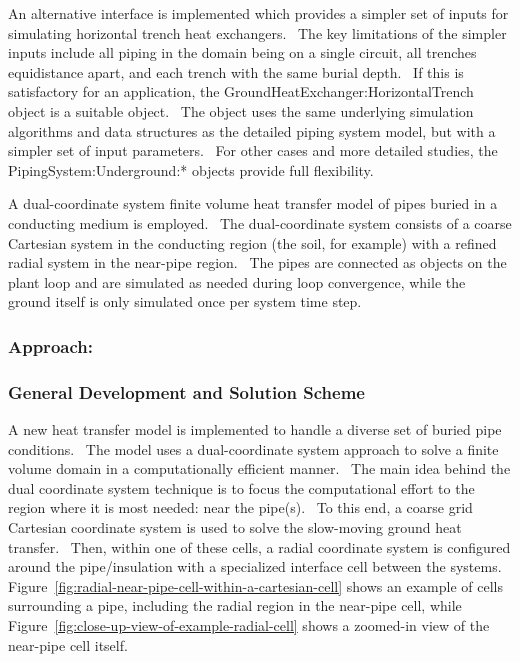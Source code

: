 An alternative interface is implemented which provides a simpler set of inputs for simulating horizontal trench heat exchangers.~ The key limitations of the simpler inputs include all piping in the domain being on a single circuit, all trenches equidistance apart, and each trench with the same burial depth.~ If this is satisfactory for an application, the GroundHeatExchanger:HorizontalTrench object is a suitable object.~ The object uses the same underlying simulation algorithms and data structures as the detailed piping system model, but with a simpler set of input parameters.~ For other cases and more detailed studies, the PipingSystem:Underground:* objects provide full flexibility.

A dual-coordinate system finite volume heat transfer model of pipes buried in a conducting medium is employed.~ The dual-coordinate system consists of a coarse Cartesian system in the conducting region (the soil, for example) with a refined radial system in the near-pipe region.~ The pipes are connected as objects on the plant loop and are simulated as needed during loop convergence, while the ground itself is only simulated once per system time step.

\subsubsection{Approach:}\label{approach-002}

\subsubsection{General Development and Solution Scheme}\label{general-development-and-solution-scheme}

A new heat transfer model is implemented to handle a diverse set of buried pipe conditions.~ The model uses a dual-coordinate system approach to solve a finite volume domain in a computationally efficient manner.~ The main idea behind the dual coordinate system technique is to focus the computational effort to the region where it is most needed: near the pipe(s).~ To this end, a coarse grid Cartesian coordinate system is used to solve the slow-moving ground heat transfer.~ Then, within one of these cells, a radial coordinate system is configured around the pipe/insulation with a specialized interface cell between the systems.~ Figure~\ref{fig:radial-near-pipe-cell-within-a-cartesian-cell} shows an example of cells surrounding a pipe, including the radial region in the near-pipe cell, while Figure~\ref{fig:close-up-view-of-example-radial-cell} shows a zoomed-in view of the near-pipe cell itself.

